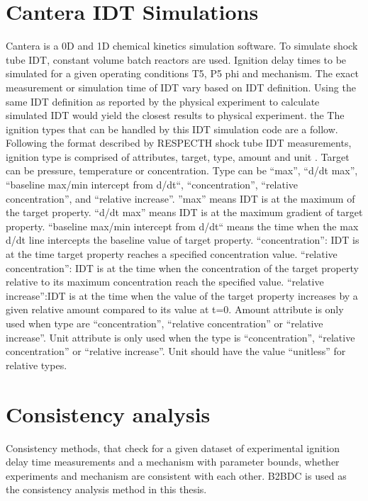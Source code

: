\section{Cantera IDT Simulations}
Cantera is a 0D and 1D chemical kinetics simulation software. To simulate shock tube IDT, constant volume batch reactors are used. Ignition delay times to be simulated for a given operating conditions T5, P5 phi and mechanism. The exact measurement or simulation time of IDT vary based on IDT definition.  Using the same IDT definition as reported by the physical experiment to calculate simulated IDT would yield the closest results to physical experiment. the The ignition types that can be handled by this IDT simulation code are a follow. Following the format described by RESPECTH shock tube IDT measurements, ignition type is comprised of attributes, target, type, amount and unit . Target can be pressure, temperature or concentration. Type can be “max”, “d/dt max”, “baseline max/min intercept from d/dt“, “concentration”, “relative concentration”, and “relative increase”. ”max” means IDT is at the maximum of the target property. “d/dt max” means IDT is at the maximum gradient of target property. “baseline max/min intercept from d/dt“ means the time when the max d/dt line intercepts the baseline value of target property. “concentration”: IDT is at the time target property reaches a specified concentration value. “relative concentration”: IDT is at the time when the concentration of the target property relative to its maximum concentration reach the specified value. “relative increase”:IDT is at the time when the value of  the target property increases by a given relative amount compared to its value at t=0.  Amount attribute is only used when type are “concentration”, “relative concentration” or “relative increase”. Unit attribute is only used when the type is  “concentration”, “relative concentration” or “relative increase”. Unit should have the value “unitless” for relative types.  



\section{Consistency analysis}

Consistency methods, that check for a given dataset of experimental ignition delay time measurements and a mechanism with parameter bounds, whether experiments and mechanism are consistent with each other. B2BDC is used as the consistency analysis method in this thesis. 



